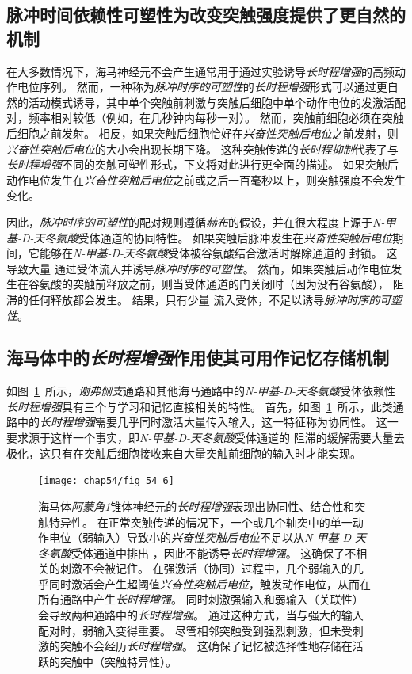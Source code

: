 \subsection{脉冲时间依赖性可塑性为改变突触强度提供了更自然的机制}

在大多数情况下，海马神经元不会产生通常用于通过实验诱导\textit{长时程增强}的高频动作电位序列。
然而，一种称为\textit{脉冲时序的可塑性}的\textit{长时程增强}形式可以通过更自然的活动模式诱导，其中单个突触前刺激与突触后细胞中单个动作电位的发激活配对，频率相对较低（例如，在几秒钟内每秒一对）。
然而，突触前细胞必须在突触后细胞之前发射。
相反，如果突触后细胞恰好在\textit{兴奋性突触后电位}之前发射，则\textit{兴奋性突触后电位}的大小会出现长期下降。
这种突触传递的\textit{长时程抑制}代表了与\textit{长时程增强}不同的突触可塑性形式，下文将对此进行更全面的描述。
如果突触后动作电位发生在\textit{兴奋性突触后电位}之前或之后一百毫秒以上，则突触强度不会发生变化。


因此，\textit{脉冲时序的可塑性}的配对规则遵循\textit{赫布}的假设，并在很大程度上源于\textit{N-甲基-D-天冬氨酸}受体通道的协同特性。
如果突触后脉冲发生在\textit{兴奋性突触后电位}期间，它能够在\textit{N-甲基-D-天冬氨酸}受体被谷氨酸结合激活时解除通道的  封锁。
这导致大量  通过受体流入并诱导\textit{脉冲时序的可塑性}。
然而，如果突触后动作电位发生在谷氨酸的突触前释放之前，则当受体通道的门关闭时（因为没有谷氨酸）， 阻滞的任何释放都会发生。
结果，只有少量  流入受体，不足以诱导\textit{脉冲时序的可塑性}。



\subsection{海马体中的\textit{长时程增强}作用使其可用作记忆存储机制}

如图~\ref{fig:54_6}~所示，\textit{谢弗侧支}通路和其他海马通路中的\textit{N-甲基-D-天冬氨酸}受体依赖性\textit{长时程增强}具有三个与学习和记忆直接相关的特性。
首先，如图~\ref{fig:54_6}~所示，此类通路中的\textit{长时程增强}需要几乎同时激活大量传入输入，这一特征称为协同性。
这一要求源于这样一个事实，即\textit{N-甲基-D-天冬氨酸}受体通道的  阻滞的缓解需要大量去极化，这只有在突触后细胞接收来自大量突触前细胞的输入时才能实现。


\begin{figure}[htbp]
	\centering
	\texttt{[image: chap54/fig\_54\_6]}
	\caption{海马体\textit{阿蒙角1}锥体神经元的\textit{长时程增强}表现出协同性、结合性和突触特异性。
		在正常突触传递的情况下，一个或几个轴突中的单一动作电位（弱输入）导致小的\textit{兴奋性突触后电位}不足以从\textit{N-甲基-D-天冬氨酸}受体通道中排出 ，因此不能诱导\textit{长时程增强}。
		这确保了不相关的刺激不会被记住。 
		在强激活（协同）过程中，几个弱输入的几乎同时激活会产生超阈值\textit{兴奋性突触后电位}，触发动作电位，从而在所有通路中产生\textit{长时程增强}。
		同时刺激强输入和弱输入（关联性）会导致两种通路中的\textit{长时程增强}。
		通过这种方式，当与强大的输入配对时，弱输入变得重要。
		尽管相邻突触受到强烈刺激，但未受刺激的突触不会经历\textit{长时程增强}。
		这确保了记忆被选择性地存储在活跃的突触中（突触特异性）。}
	\label{fig:54_6}
\end{figure}


